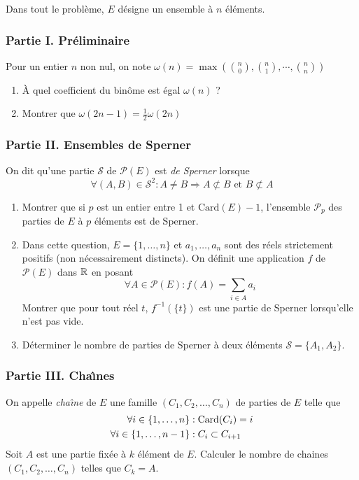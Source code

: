 Dans tout le probl{\`e}me, $E$ d{\'e}signe un ensemble {\`a} $n$ {\'e}l{\'e}ments.
\subsubsection*{Partie I. Pr{\'e}liminaire}
Pour un entier $n$ non nul, on note $\omega (n)=\max(\binom{n}{0}, \binom{n}{1}, \cdots, \binom{n}{n})$
\begin{enumerate}
\item \`A quel coefficient du binôme est égal $\omega(n)$ ?
\item
Montrer que $\omega(2n-1)=\frac{1}{2}\omega(2n)$
\end{enumerate}

\subsubsection*{Partie II. Ensembles de Sperner}
On dit qu'une partie $\mathcal{S}$ de ${\mathcal P}(E)$ est \emph{de Sperner} lorsque
\begin{displaymath}
\forall (A,B) \in {\mathcal S}^2 : A \not= B \Rightarrow
A\not\subset B \text{ et } B \not\subset A 
\end{displaymath}
\begin{enumerate}
\item
Montrer que si $p$ est un entier entre 1 et $\mathrm{Card}(E)-1$, l'ensemble $\mathcal{P}_p$ des parties  de $E$ {\`a} $p$ {\'e}l{\'e}ments est de Sperner.
\item Dans cette question, $E=\{1,\ldots,n\}$ et $a_1,\ldots,a_n$ sont des r{\'e}els strictement positifs (non n{\'e}cessairement distincts).
On d{\'e}finit une application $f$ de ${\mathcal P}(E)$ dans $\mathbb{R}$ en posant 
\begin{displaymath}
 \forall A \in \mathcal{P}(E) : f(A)=\sum_{i\in A}a_i
\end{displaymath}
Montrer que pour tout r{\'e}el $t$, $f^{-1}(\{t\})$ est une partie de Sperner lorsqu'elle n'est pas vide.
\item Déterminer le nombre de parties de Sperner {\`a} deux {\'e}l{\'e}ments $\mathcal{S} =\{A_1,A_2\}$.
\end{enumerate}
\subsubsection*{Partie III. Cha{\^\i}nes}
On appelle {\it cha{\^\i}ne} de $E$ une famille $(C_1,C_2,\ldots,C_n)$ de parties de $E$ telle que
\begin{align*}
    \forall i \in \{1,\ldots ,n\} &: \hbox{Card}(C_i)= i\\
    \forall i \in \{1,\ldots ,n-1\} &: C_i \subset C_{i+1}
\end{align*}
Soit $A$ est une partie fix{\'e}e {\`a} $k$ {\'e}l{\'e}ment de $E$. Calculer le nombre de chaines $(C_1,C_2,\ldots,C_n)$ telles que $C_k=A$.

